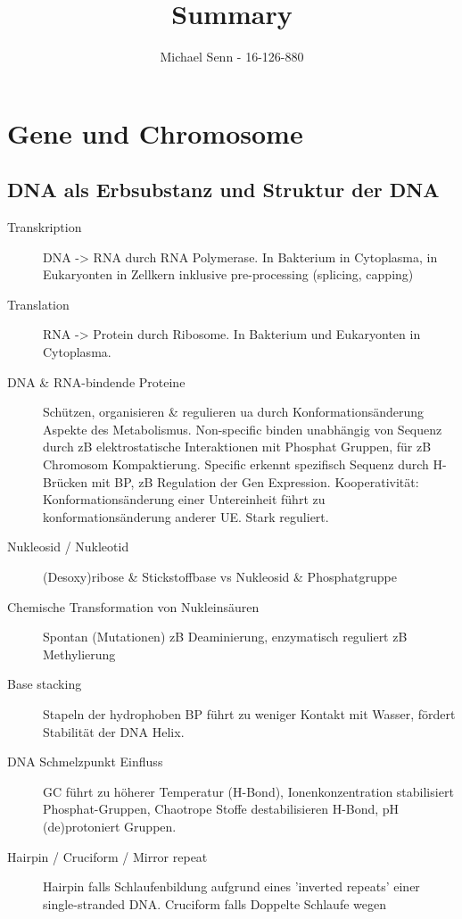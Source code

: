 \documentclass[a4paper,twocolumn,usegeometry,english,fontsize=5,DIV=28]{scrartcl}
\title{Summary}
\author{Michael Senn \maillink{michael.senn@students.unibe.ch} - 16-126-880}
\date{\printdate}
\begin{document}

\section{Gene und Chromosome}

\subsection{DNA als Erbsubstanz und Struktur der DNA}

\begin{description}
	\item[Transkription] DNA -> RNA durch RNA Polymerase. In Bakterium in
		Cytoplasma, in Eukaryonten in Zellkern inklusive pre-processing
		(splicing, capping)
	\item[Translation] RNA -> Protein durch Ribosome. In Bakterium und
		Eukaryonten in Cytoplasma.
	\item[DNA \& RNA-bindende Proteine] Schützen, organisieren \&
		regulieren ua durch Konformationsänderung Aspekte des
		Metabolismus. Non-specific binden unabhängig von Sequenz durch
		zB elektrostatische Interaktionen mit Phosphat Gruppen, für zB
		Chromosom Kompaktierung. Specific erkennt spezifisch Sequenz
		durch H-Brücken mit BP, zB Regulation der Gen Expression.
		Kooperativität: Konformationsänderung einer Untereinheit führt
		zu konformationsänderung anderer UE. Stark reguliert.
	\item[Nukleosid / Nukleotid] (Desoxy)ribose \& Stickstoffbase vs
		Nukleosid \& Phosphatgruppe
	\item[Chemische Transformation von Nukleinsäuren] Spontan (Mutationen)
		zB Deaminierung, enzymatisch reguliert zB Methylierung
	\item[Base stacking] Stapeln der hydrophoben BP führt zu weniger
		Kontakt mit Wasser, fördert Stabilität der DNA Helix.
	\item[DNA Schmelzpunkt Einfluss] GC führt zu höherer Temperatur
		(H-Bond), Ionenkonzentration stabilisiert Phosphat-Gruppen,
		Chaotrope Stoffe destabilisieren H-Bond, pH (de)protoniert
		Gruppen.
	\item[Hairpin / Cruciform / Mirror repeat] Hairpin falls
		Schlaufenbildung aufgrund eines 'inverted repeats' einer
		single-stranded DNA. Cruciform falls Doppelte Schlaufe wegen

\end{description}
\end{document}

